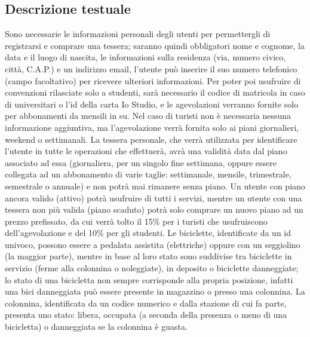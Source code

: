 \documentclass[a4paper,twoside]{article}
\begin{document}
\subsection{Descrizione testuale}
Sono necessarie le informazioni personali degli utenti per permettergli di registrarsi e comprare una tessera; saranno quindi obbligatori nome e cognome, la data e il luogo di nascita, le informazioni sulla residenza (via, numero civico, città, C.A.P.) e un indirizzo email, l'utente può inserire il suo numero telefonico (campo facoltativo) per ricevere ulteriori informazioni.\newline
Per poter poi usufruire di convenzioni rilasciate solo a studenti, sarà necessario il codice di matricola in caso di universitari o l'id della carta Io Studio, e le agevolazioni verranno fornite solo per abbonamenti da mensili in su.\newline
Nel caso di turisti non è necessaria nessuna informazione aggiuntiva, ma l'agevolazione verrà fornita solo ai piani giornalieri, weekend o settimanali.\newline
La tessera personale, che verrà utilizzata per identificare l'utente in tutte le operazioni che effettuerà, avrà una validità data dal piano associato ad essa (giornaliera, per un singolo fine settimana, oppure essere collegata ad un abbonamento di varie taglie: settimanale, mensile, trimestrale, semestrale o annuale) e non potrà mai rimanere senza piano.\newline 
Un utente con piano ancora valido (attivo) potrà usufruire di tutti i servizi, mentre un utente con una tessera non più valida (piano scaduto) potrà solo comprare un nuovo piano ad un prezzo prefissato, da cui verrà tolto il 15\% per i turisti che usufruiscono dell'agevolazione e del 10\% per gli studenti.\newline
Le biciclette, identificate da un id univoco, possono essere a pedalata assistita (elettriche) oppure con un seggiolino (la maggior parte), mentre in base al loro stato sono suddivise tra biciclette in servizio (ferme alla colonnina o noleggiate), in deposito o biciclette danneggiate; lo stato di una bicicletta non sempre corrisponde alla propria posizione, infatti una bici danneggiata può  essere presente in magazzino o presso una colonnina.\newline
La  colonnina, identificata da un codice numerico e dalla stazione di cui fa parte, presenta uno stato: libera, occupata (a seconda della presenza o meno di una bicicletta) o danneggiata se la colonnina è guasta.\newline
\end{document}
